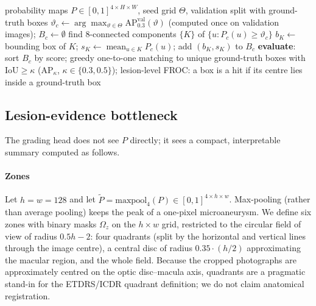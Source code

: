 \begin{algorithm}[!htbp]
\caption{Segmentation-guided lesion proposals and evaluation.}
\label{alg:det}
\begin{algorithmic}[1]
\Require probability maps $P\in[0,1]^{4\times H\times W}$, seed grid $\Theta$, validation split with ground-truth boxes
  \State $\vartheta_c\gets\arg\max_{\vartheta\in\Theta}\mathrm{AP}_{0.3}^{\text{val}}(\vartheta)$ (computed once on validation images); $B_c\gets\emptyset$
  \State find 8-connected components $\{K\}$ of $\{u:P_c(u)\ge\vartheta_c\}$
    \State $b_K\gets$ bounding box of $K$; $s_K\gets\operatorname{mean}_{u\in K}P_c(u)$; add $(b_K,s_K)$ to $B_c$
  \EndFor
\EndFor
\State \textbf{evaluate}: sort $B_c$ by score; greedy one-to-one matching to unique ground-truth boxes with $\mathrm{IoU}\ge\kappa$ (AP$_\kappa$, $\kappa\in\{0.3,0.5\}$); lesion-level FROC: a box is a hit if its centre lies inside a ground-truth box
\end{algorithmic}
\end{algorithm}

\subsection{Lesion-evidence bottleneck}
\label{sec:evidence}
The grading head does not see $P$ directly; it sees a compact, interpretable summary computed as follows.

\paragraph{Zones} Let $h=w=128$ and let $\tilde P=\mathrm{maxpool}_{4}(P)\in[0,1]^{4\times h\times w}$. Max-pooling (rather than average pooling) keeps the peak of a one-pixel microaneurysm. We define six zones with binary masks $\Omega_z$ on the $h\times w$ grid, restricted to the circular field of view of radius $0.5h-2$: four quadrants (split by the horizontal and vertical lines through the image centre), a central disc of radius $0.35\cdot(h/2)$ approximating the macular region, and the whole field. Because the cropped photographs are approximately centred on the optic disc--macula axis, quadrants are a pragmatic stand-in for the ETDRS/ICDR quadrant definition; we do not claim anatomical registration.

